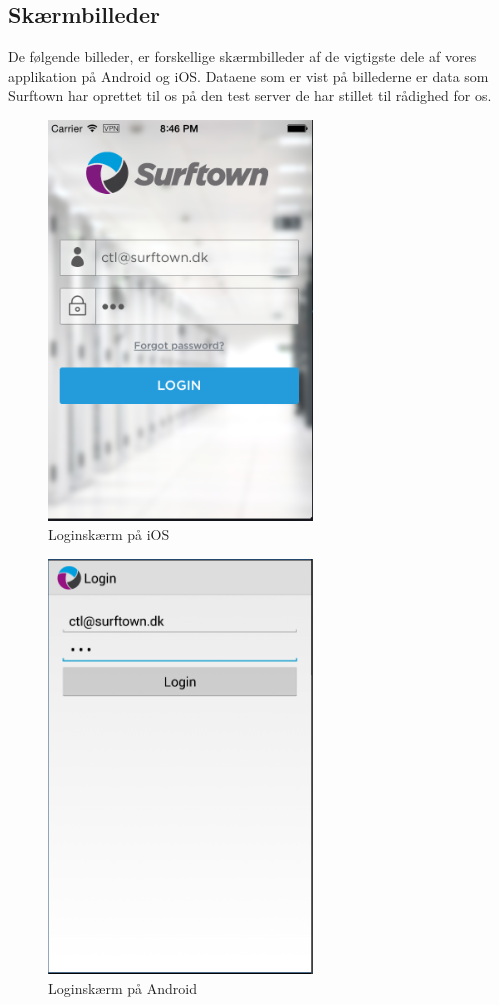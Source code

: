 \documentclass[12pt]{article}
\begin{document}
\subsection{Skærmbilleder}
De følgende billeder, er forskellige skærmbilleder af de vigtigste dele af vores applikation på Android og iOS. Dataene som er vist på billederne er data som Surftown har oprettet til os på den test server de har stillet til rådighed for os.
\newpage
\begin{figure}[h]
	\centering
	\includegraphics[width=7cm]{ios/login.png}
	\caption{Loginskærm på iOS}
\end{figure}
\newpage
\begin{figure}[h]
	\centering
	\includegraphics[width=7cm]{screenshots/login.png}
	\caption{Loginskærm på Android}
\end{figure}
\end{document}

